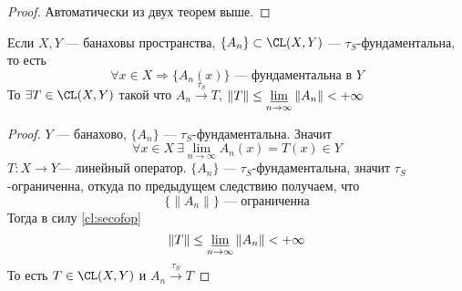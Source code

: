 \begin{proof}
	Автоматически из двух теорем выше.
\end{proof}
\begin{next2}
	Если $X,Y$ --- банаховы пространства, $\{A_n\} \subset \CL(X,Y)$ --- $\tau_S$-фундаментальна, то есть 
	$$
	\forall x \in X \Rightarrow \{A_n(x)\} \text{ --- фундаментальна в $Y$}
	$$
	То $\exists T \in \CL(X,Y)$ такой что $A_n \xrightarrow{\tau_S}T$, $\|T\| \leq \varliminf\limits_{n \to \infty}\|A_n\| < + \infty$
\end{next2}
\begin{proof}
	$Y$ --- банахово, $\{A_n\}$ --- $\tau_S$-фундаментальна. Значит 
	$$
	\forall x \in X \ \exists \lim\limits_{n \to \infty} A_n(x) = T(x) \in Y
	$$
	$T\colon X \to Y$--- линейный оператор. $\{A_n\}$ --- $\tau_S$-фундаментальна, значит $\tau_S$-ограниченна, откуда по предыдущем следствию получаем, что 
	$$
	\{\|A_n\|\} \text{ --- ограниченна}
	$$
	Тогда в силу \ref{cl:secofop} 
	$$
	\|T\| \leq \varliminf_{n \to \infty}\|A_n\| < +\infty
	$$
	То есть $T \in \CL(X,Y)$ и $A_n \xrightarrow{\tau_S} T$
\end{proof}